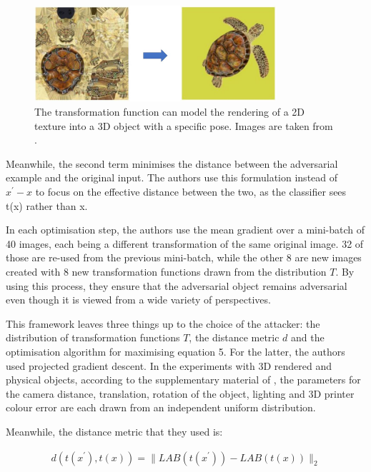 \begin{figure}[h]
    \centering
    \includegraphics[width=0.8\textwidth]{graphics/rendering.JPG}
    \caption{The transformation function can model the rendering of a 2D texture into a 3D object with a specific pose. Images are taken from \cite{athalye}.}
    \label{fig:rendering}
\end{figure}

Meanwhile, the second term minimises the distance between the adversarial example and the original input. The authors use this formulation instead of $x^\prime - x$ to focus on the effective distance between the two, as the classifier sees t(x) rather than x.

In each optimisation step, the authors use the mean gradient over a mini-batch of 40 images, each being a different transformation of the same original image. 32 of those are re-used from the previous mini-batch, while the other 8 are new images created with 8 new transformation functions drawn from the distribution $T$. By using this process, they ensure that the adversarial object remains adversarial even though it is viewed from a wide variety of perspectives.

This framework leaves three things up to the choice of the attacker: the distribution of transformation functions $T$, the distance metric $d$ and the optimisation algorithm for maximising equation 5. For the latter, the authors used projected gradient descent. In the experiments with 3D rendered and physical objects, according to the supplementary material of \cite{athalye}, the parameters for the camera distance, translation, rotation of the object, lighting and 3D printer colour error are each drawn from an independent uniform distribution.

Meanwhile, the distance metric that they used is:

\begin{equation}
\begin{aligned}
d(t(x^\prime), t(x)) = \|LAB(t(x^\prime)) - LAB(t(x))\|_2
\end{aligned}
\end{equation}

